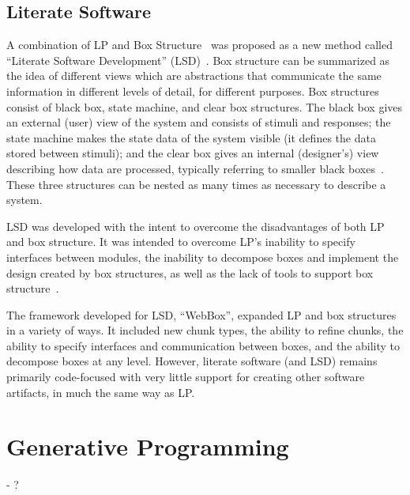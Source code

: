 \subsection{Literate Software}

A combination of LP and Box Structure~\cite{Mills1986} was proposed as a new
method called ``Literate Software Development''
(LSD)~\cite{AlMatiiAndBoujarwah2002}. Box structure can be summarized as the
idea of different views which are abstractions that communicate the same
information in different levels of detail, for different purposes. Box
structures consist of black box, state machine, and clear box structures. The
black box gives an external (user) view of the system and consists of stimuli
and responses; the state machine makes the state data of the system visible (it
defines the data stored between stimuli); and the clear box gives an internal
(designer's) view describing how data are processed, typically referring to
smaller black boxes~\cite{Mills1986}. These three structures can be nested as
many times as necessary to describe a system.

LSD was developed with the intent to overcome the disadvantages of both LP and
box structure. It was intended to overcome LP's inability to specify interfaces
between modules, the inability to decompose boxes and implement the design
created by box structures, as well as the lack of tools to support box
structure~\cite{Deck1996}.

The framework developed for LSD, ``WebBox'', expanded LP and box structures in a
variety of ways. It included new chunk types, the ability to refine chunks, the
ability to specify interfaces and communication between boxes, and the ability
to decompose boxes at any level. However, literate software (and LSD) remains
primarily code-focused with very little support for creating other software
artifacts, in much the same way as LP.

\section{Generative Programming}
 - ?
